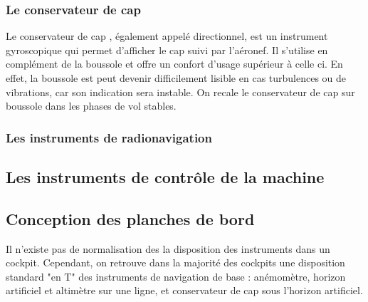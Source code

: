 	\subsubsection{Le conservateur de cap}
	
	Le \gls{conservateur de cap} , également appelé directionnel, est un instrument gyroscopique qui permet d'afficher le cap suivi par l'aéronef. Il s'utilise en complément de la boussole et offre un confort d'usage supérieur à celle ci. En effet, la boussole est peut devenir difficilement lisible en cas turbulences ou de vibrations, car son indication sera instable. On recale le conservateur de cap sur boussole dans les phases de vol stables.
	
	\begin{figure}[H]	
	\centering
	\end{figure}
	
	\subsubsection{Les instruments de radionavigation}
	
	\subsection{Les instruments de contrôle de la machine}
	
	\subsection{Conception des planches de bord}
	Il n'existe pas de normalisation des la disposition des instruments dans un cockpit. Cependant, on retrouve dans la majorité des cockpits une disposition standard "en T" des instruments de navigation de base : anémomètre, horizon artificiel et altimètre sur une ligne, et conservateur de cap sous l'horizon artificiel.
	
	\begin{figure}[H]	
	\centering
	\end{figure}
	
